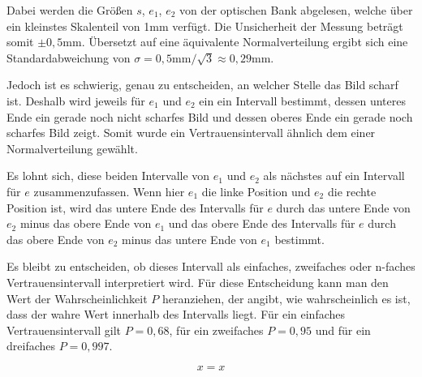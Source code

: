 \documentclass[a4paper,12pt]{article}
\begin{document}
Dabei werden die Größen $s$, $e_1$, $e_2$ von der optischen Bank abgelesen, welche über ein kleinstes Skalenteil
von 1mm verfügt. Die Unsicherheit der Messung beträgt somit $\pm 0,5\mathrm{mm}$. Übersetzt auf eine äquivalente
Normalverteilung ergibt sich eine Standardabweichung von $\sigma = 0,5\mathrm{mm} / \sqrt{3} \approx 0,29\mathrm{mm}$.

Jedoch ist es schwierig, genau zu entscheiden, an welcher Stelle das Bild scharf ist. Deshalb wird jeweils für $e_1$
und $e_2$ ein ein Intervall bestimmt, dessen unteres Ende ein gerade noch nicht scharfes Bild und dessen oberes
Ende ein gerade noch scharfes Bild zeigt. Somit wurde ein Vertrauensintervall ähnlich dem einer Normalverteilung
gewählt.

Es lohnt sich, diese beiden Intervalle von $e_1$ und $e_2$ als nächstes auf ein Intervall für $e$ zusammenzufassen.
Wenn hier $e_1$ die linke Position und $e_2$ die rechte Position ist, wird das untere Ende des Intervalls für $e$
durch das untere Ende von $e_2$ minus das obere Ende von $e_1$ und das obere Ende des Intervalls für $e$ durch
das obere Ende von $e_2$ minus das untere Ende von $e_1$ bestimmt. %

Es bleibt zu entscheiden, ob dieses Intervall als einfaches, zweifaches oder n-faches Vertrauensintervall
interpretiert wird. Für diese Entscheidung kann man den Wert der Wahrscheinlichkeit $P$ heranziehen, der angibt,
wie wahrscheinlich es ist, dass der wahre Wert innerhalb des Intervalls liegt. Für ein einfaches Vertrauensintervall
gilt $P = 0,68$, für ein zweifaches $P = 0,95$ und für ein dreifaches $P = 0,997$. %




\begin{equation}
    \label{Gl1}
    x = x
\end{equation}

\vspace{0,5cm}
\end{document}
